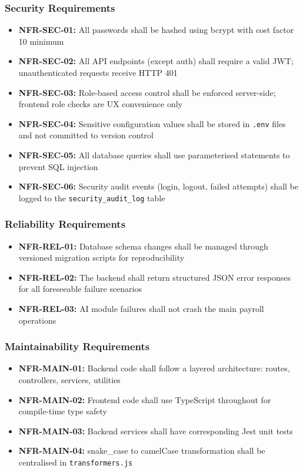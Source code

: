 \documentclass[12pt,a4paper]{report}
\begin{document}
\subsubsection{Security Requirements}
\begin{itemize}
    \item \textbf{NFR-SEC-01:} All passwords shall be hashed using bcrypt with cost factor 10 minimum
    \item \textbf{NFR-SEC-02:} All API endpoints (except auth) shall require a valid JWT; unauthenticated requests receive HTTP 401
    \item \textbf{NFR-SEC-03:} Role-based access control shall be enforced server-side; frontend role checks are UX convenience only
    \item \textbf{NFR-SEC-04:} Sensitive configuration values shall be stored in \texttt{.env} files and not committed to version control
    \item \textbf{NFR-SEC-05:} All database queries shall use parameterised statements to prevent SQL injection
    \item \textbf{NFR-SEC-06:} Security audit events (login, logout, failed attempts) shall be logged to the \texttt{security\_audit\_log} table
\end{itemize}

\subsubsection{Reliability Requirements}
\begin{itemize}
    \item \textbf{NFR-REL-01:} Database schema changes shall be managed through versioned migration scripts for reproducibility
    \item \textbf{NFR-REL-02:} The backend shall return structured JSON error responses for all foreseeable failure scenarios
    \item \textbf{NFR-REL-03:} AI module failures shall not crash the main payroll operations
\end{itemize}

\subsubsection{Maintainability Requirements}
\begin{itemize}
    \item \textbf{NFR-MAIN-01:} Backend code shall follow a layered architecture: routes, controllers, services, utilities
    \item \textbf{NFR-MAIN-02:} Frontend code shall use TypeScript throughout for compile-time type safety
    \item \textbf{NFR-MAIN-03:} Backend services shall have corresponding Jest unit tests
    \item \textbf{NFR-MAIN-04:} snake\_case to camelCase transformation shall be centralised in \texttt{transformers.js}
\end{itemize}
\end{document}
